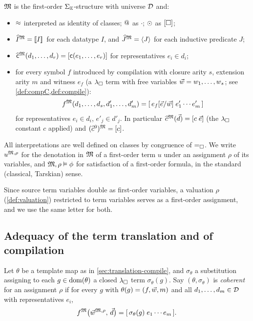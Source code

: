 \begin{definition}
\label{def:model}
$\mathfrak{M}$ is the first-order $\Sigma_{\mathbb{E}}$-structure with universe $\mathcal{D}$ and:
\begin{itemize}[leftmargin=2em]
\item $\approx$ interpreted as identity of classes; $\mathbin{@}$ as $\cdot$;
  $\odot$ as $[\square]$;
\item $\widehat{I}^{\mathfrak{M}} = [\![ I ]\!]_{}$ for each datatype $I$, and
  $\widehat{J}^{\mathfrak{M}} = \langle J \rangle$ for each inductive predicate $J$;
\item $\widehat{\mathsf{c}}^{\mathfrak{M}}(d_1, \dots, d_r) = [\mathsf{c}(e_1, \dots,
  e_r)]$ for representatives $e_i \in d_i$;
\item for every symbol $f$ introduced by compilation with closure arity
  $s$, extension arity $m$ and witness $e_f$ (a $\lambda_{\square}$ term with free
  variables $\vec{w} = w_1, \dots, w_s$; see
  \cref{def:compC,def:compile}):
  \[
    f^{\mathfrak{M}}(d_1, \dots, d_s, d'_1, \dots, d'_m) =
      [\,e_f[\vec{e}/\vec{w}]\; e'_1 \cdots e'_m\,]
  \]
  for representatives $e_i \in d_i$, $e'_j \in d'_j$.  In particular
  $\widehat{c}^{\mathfrak{M}}(\vec{d}) = [c\; \vec{e}]$ (the $\lambda_{\square}$ constant $c$
  applied) and $(\widehat{c}^0)^{\mathfrak{M}} = [c]$.
\end{itemize}
All interpretations are well defined on classes by congruence of
$=_{\square}$.  We write $u^{\mathfrak{M},\rho}$ for the denotation in $\mathfrak{M}$ of a
first-order term $u$ under an assignment $\rho$ of its variables, and
$\mathfrak{M}, \rho \vDash \phi$ for satisfaction of a first-order formula, in the
standard (classical, Tarskian) sense.
\end{definition}

Since source term variables double as first-order variables, a valuation
$\rho$ (\cref{def:valuation}) restricted to term variables serves as a
first-order assignment, and we use the same letter for both.

\subsection{Adequacy of the term translation and of compilation}
\label{sec:semantics-adequacy}

\begin{definition}
\label{def:coherent}
Let $\theta$ be a template map as in \cref{sec:translation-compile}, and
$\sigma_\theta$ a substitution assigning to each $g \in \mathrm{dom}(\theta)$ a
closed $\lambda_{\square}$ term $\sigma_\theta(g)$.  Say $(\theta, \sigma_\theta)$ is
\emph{coherent} for an assignment $\rho$ if for every $g$ with $\theta(g)
= (f, \vec{w}, m)$ and all $d_1, \dots, d_m \in \mathcal{D}$ with
representatives $e_i$,
\[
  f^{\mathfrak{M}}\bigl(\vec{w}^{\mathfrak{M},\rho},\, \vec{d}\bigr) =
  [\,\sigma_\theta(g)\;e_1 \cdots e_m\,].
\]
\end{definition}

